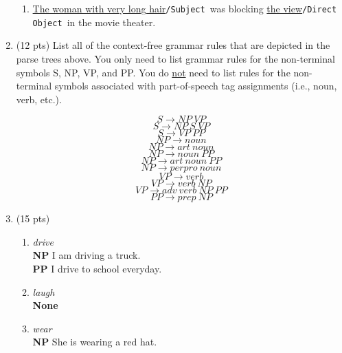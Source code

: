 \documentclass[11pt]{article}
\newcommand{\sub}{\texttt{/Subject }}
\newcommand{\dobj}{\texttt{/Direct Object }}
\begin{document}
\begin{enumerate}
\begin{enumerate}
\item \underline{The woman with very long hair}\sub was blocking \underline{the view}\dobj in the movie theater.
\vspace*{.5in}


\end{enumerate}


\newpage

\item (12 pts) List all of the context-free grammar rules that are depicted in the parse trees above.  You only need to list grammar rules for the non-terminal symbols S, NP, VP, and PP. You do \underline{not} need to list rules for the non-terminal symbols associated with part-of-speech tag assignments (i.e., noun, verb, etc.).

\vspace*{.2in}
$$S \rightarrow NP \  VP$$
$$S \rightarrow NP \ S \  VP$$
$$S \rightarrow VP \  PP$$
\vspace*{.2in}
$$NP \rightarrow noun$$
$$NP \rightarrow art \ noun$$
$$NP \rightarrow noun \ PP$$
$$NP \rightarrow art \ noun \ PP$$
$$NP \rightarrow perpro \ noun$$
\vspace*{.2in}
$$VP \rightarrow verb$$
$$VP \rightarrow verb \ NP$$
$$VP \rightarrow adv \ verb \ NP \ PP$$
\vspace*{.2in}
$$PP \rightarrow prep \ NP$$

\newpage

\item (15 pts)   

\begin{enumerate}

\item {\it drive}\\
\textbf{NP} I am driving a truck.\\
\textbf{PP} I drive to school everyday.

\item {\it laugh}\\
\textbf{None}

\item {\it wear}\\
\textbf{NP} She is wearing a red hat.


\end{enumerate}
\end{enumerate}
\end{document}
